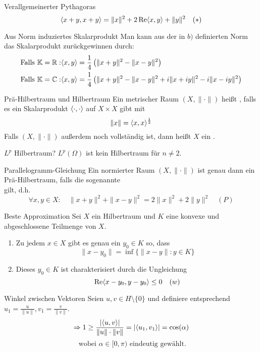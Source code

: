 \begin{karte}{Verallgemeinerter Pythagoras}
	\[ \langle x + y, x + y \rangle = \| x\|^{2} + 2 \mathop{\rm Re}\nolimits \langle x, y \rangle + \| y \|^{2} \quad (*) \label{eq:15.2-*} \]
\end{karte}

\begin{karte}{Aus Norm induziertes Skalarprodukt}
	Man kann aus der in \hyperref[prop:15.2b]{$b)$} definierten Norm das Skalarprodukt zurückgewinnen durch:
	\begin{align*}
		\text{Falls } \mathbb{K} = \mathbb{R}: &  \langle x, y \rangle = \frac{1}{4} \left( \| x + y \|^{2} - \| x - y \|^{2} \right) \\
		\text{Falls } \mathbb{K} = \mathbb{C}: &  \langle x, y \rangle = \frac{1}{4} \left( \| x + y \|^{2} - \| x - y \|^{2} + i \| x + i y\|^{2} - i \| x - iy\|^{2} \right)
	\end{align*}
\end{karte}


\begin{karte}{Prä-Hilbertraum und Hilbertraum}
	Ein metrischer Raum $(X, \| \cdot \|)$ hei{\ss}t , falls es ein Skalarprodukt $\langle \cdot, \cdot \rangle$ auf $X \times X$ gibt mit
		\[ \| x \| = \langle x, x \rangle^{\frac{1}{2}} \]
	Falls $(X, \| \cdot \|)$ au{\ss}erdem noch vollständig ist, dann hei{\ss}t $X$ ein .	
\end{karte}


\begin{karte}{$L^{p}$ Hilbertraum?}
	$L^{p}(\Omega)$ ist kein Hilbertraum für $n \neq 2$.
\end{karte}


\begin{karte}{Parallelogramm-Gleichung}
	Ein normierter Raum $(X, \| \cdot \|)$ ist genau dann ein Prä-Hilbertraum, falls die sogenannte \\ 
	 gilt, d.h.
	\[ \forall x, y \in X: \quad \|x + y \|^{2} + \| x - y \|^{2} = 2 \| x \|^{2} + 2 \| y \|^{2} \quad (P) \label{eq:15.6-rallelogrammGleichung} \]
\end{karte}

\begin{karte}{Beste Approximation}
	Sei $X$ ein Hilbertraum und $K$ eine konvexe und abgeschlossene Teilmenge von $X$.
	\begin{enumerate}[label=\alph*\upshape)]
		\item Zu jedem $x \in X$ gibt es genau ein $y_{0} \in K$ so, dass
			\[ \| x - y_{0} \| = \inf \{ \| x - y \|: y \in K \} \]
		\item Dieses $y_{0} \in K$ ist charakterisiert durch die Ungleichung 
			\[ \mathop{\rm Re}\nolimits \langle x - y_{0}, y - y_{0} \rangle \leq 0 \quad (w) \label{eq:15.7.5-SkalarproductbestApproximation} \]
	\end{enumerate}
\end{karte}


\begin{karte}{Winkel zwischen Vektoren}
		Seien $u, v \in H \setminus \{ 0 \}$ und definiere entsprechend $u_{1} = \frac{u}{\| u \|}, v_{1} = \frac{v}{\| v \|}$.
		\[ \Rightarrow 1 \geq \frac{|\langle u, v \rangle|}{\|u \| \cdot \| v \|} = | \langle u_{1}, v_{1} \rangle | = \cos(\alpha) \] \[ \text{ wobei } \alpha \in [0, \pi) \text{ eindeutig gewählt.} \]
\end{karte}